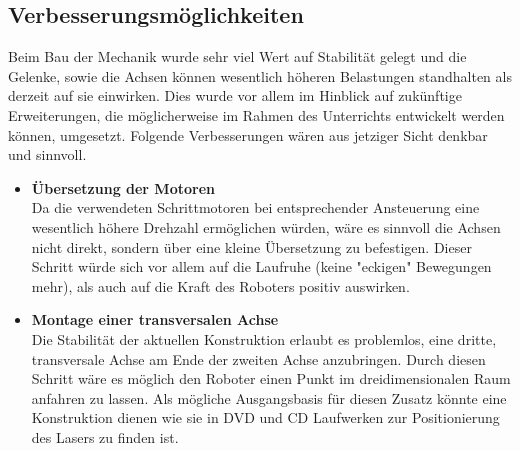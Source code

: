 \subsection{Verbesserungsmöglichkeiten}
Beim Bau der Mechanik wurde sehr viel Wert auf Stabilität gelegt und die Gelenke, sowie die Achsen können wesentlich höheren Belastungen standhalten als derzeit auf sie einwirken. 
Dies wurde vor allem im Hinblick auf zukünftige Erweiterungen, die möglicherweise im Rahmen des Unterrichts entwickelt werden können, umgesetzt. Folgende Verbesserungen wären aus jetziger Sicht denkbar und sinnvoll.

\begin{itemize}
\item \textbf{Übersetzung der Motoren}\\
Da die verwendeten Schrittmotoren bei entsprechender Ansteuerung eine wesentlich höhere Drehzahl ermöglichen würden, wäre es sinnvoll die Achsen nicht direkt, sondern über eine kleine Übersetzung zu befestigen. Dieser Schritt würde sich vor allem auf die Laufruhe (keine "eckigen" Bewegungen mehr), als auch auf die Kraft des Roboters positiv auswirken.

\item \textbf{Montage einer transversalen Achse}\\
Die Stabilität der aktuellen Konstruktion erlaubt es problemlos, eine dritte, transversale Achse am Ende der zweiten Achse anzubringen. Durch diesen Schritt wäre es möglich den Roboter einen Punkt im dreidimensionalen Raum anfahren zu lassen.
Als mögliche Ausgangsbasis für diesen Zusatz könnte eine Konstruktion dienen wie sie in DVD und CD Laufwerken zur Positionierung des Lasers zu finden ist.
\end{itemize}